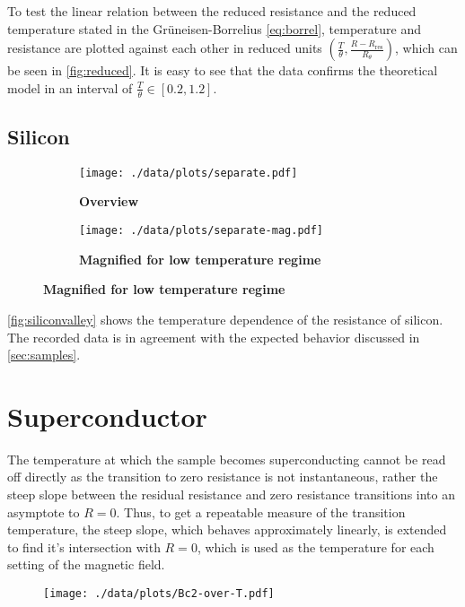 To test the linear relation between the reduced resistance and the reduced temperature stated in the Grüneisen-Borrelius \autoref{eq:borrel}, temperature and resistance are plotted against each other in reduced units $\left(\frac{T}{\theta}, \frac{R-R_\text{res}}{R_\theta}\right)$, which can be seen in \autoref{fig:reduced}.
It is easy to see that the data confirms the theoretical model in an interval of $\frac{T}{\theta}\in [0.2, 1.2]$.

\subsection{Silicon}
\begin{figure}
\begin{adjustwidth}{-1cm}{-1cm}
	\centering
	\begin{subfigure}{.55\textwidth}
		\centering
		\texttt{[image: ./data/plots/separate.pdf]}
		\caption{\textbf{Overview}}
	\end{subfigure}
	\hfill
	\begin{subfigure}{.55\textwidth}
		\centering
		\texttt{[image: ./data/plots/separate-mag.pdf]}
		\caption{\textbf{Magnified for low temperature regime}}
	\end{subfigure}
	\label{fig:siliconvalley}
\end{adjustwidth}
\end{figure}

\autoref{fig:siliconvalley} shows the temperature dependence of the resistance of silicon.
The recorded data is in agreement with the expected behavior discussed in \autoref{sec:samples}.

\section{Superconductor}
The temperature at which the sample becomes superconducting cannot be read off directly as the transition to zero resistance is not instantaneous, rather the steep slope between the residual resistance and zero resistance transitions into an asymptote to $R = 0$.
Thus, to get a repeatable measure of the transition temperature, the steep slope, which behaves approximately linearly, is extended to find it's intersection with $R = 0$, which is used as the temperature for each setting of the magnetic field.
\begin{figure}
	\centering
	\texttt{[image: ./data/plots/Bc2-over-T.pdf]}
	\label{fig:Bc2-over-T}
\end{figure}

